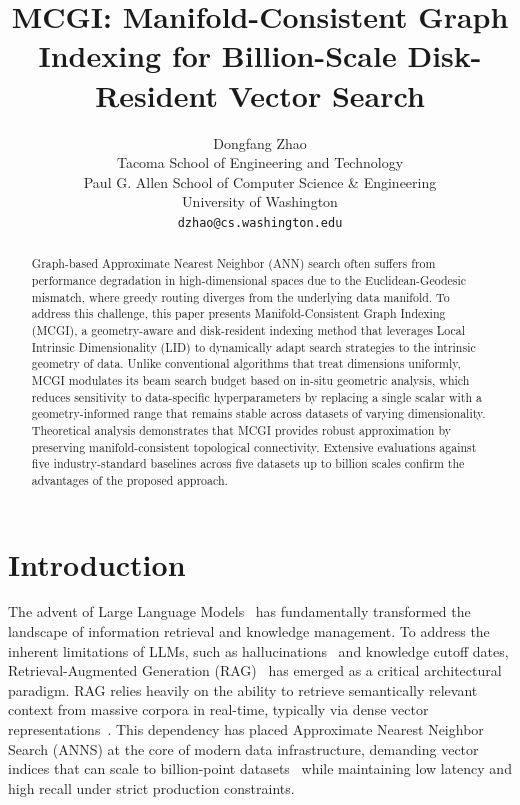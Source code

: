 \documentclass{article}
\title{MCGI: Manifold-Consistent Graph Indexing for Billion-Scale Disk-Resident Vector Search}
\author{
  Dongfang Zhao \\
  Tacoma School of Engineering and Technology \\
  Paul G. Allen School of Computer Science \& Engineering \\
  University of Washington\\
  \texttt{dzhao@cs.washington.edu}
}
\theoremstyle{plain}
\theoremstyle{definition}
\theoremstyle{remark}
\begin{document}
\maketitle 

\begin{abstract}
Graph-based Approximate Nearest Neighbor (ANN) search often suffers from performance degradation in high-dimensional spaces due to the Euclidean-Geodesic mismatch, where greedy routing diverges from the underlying data manifold. To address this challenge, this paper presents Manifold-Consistent Graph Indexing (MCGI), a geometry-aware and disk-resident indexing method that leverages Local Intrinsic Dimensionality (LID) to dynamically adapt search strategies to the intrinsic geometry of data. Unlike conventional algorithms that treat dimensions uniformly, MCGI modulates its beam search budget based on in-situ geometric analysis, which reduces sensitivity to data-specific hyperparameters by replacing a single scalar with a geometry-informed range that remains stable across datasets of varying dimensionality. Theoretical analysis demonstrates that MCGI provides robust approximation by preserving manifold-consistent topological connectivity. Extensive evaluations against five industry-standard baselines across five datasets up to billion scales confirm the advantages of the proposed approach.
\end{abstract}

\section{Introduction}
\label{sec:intro}

The advent of Large Language Models~\cite{brown2020language, touvron2023llama} has fundamentally transformed the landscape of information retrieval and knowledge management. To address the inherent limitations of LLMs, such as hallucinations~\cite{ji2023survey} and knowledge cutoff dates, Retrieval-Augmented Generation (RAG)~\cite{lewis2020retrieval} has emerged as a critical architectural paradigm. RAG relies heavily on the ability to retrieve semantically relevant context from massive corpora in real-time, typically via dense vector representations~\cite{karpukhin2020dense}. This dependency has placed Approximate Nearest Neighbor Search (ANNS) at the core of modern data infrastructure, demanding vector indices that can scale to billion-point datasets~\cite{simhadri2022neurips} while maintaining low latency and high recall under strict production constraints.
\end{document}
